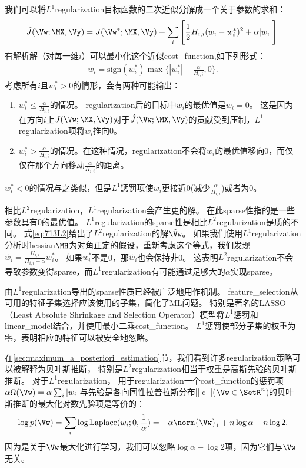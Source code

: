 我们可以将$L^1$\gls{regularization}目标函数的二次近似分解成一个关于参数的求和：
\begin{align}
 \hat J(\Vw; \MX, \Vy) = J(\Vw^*; \MX, \Vy) + \sum_i \Bigg [\frac{1}{2} H_{i,i} (w_i - w_i^*)^2 
 + \alpha |w_i| \Bigg].  %
\end{align}
有解析解（对每一维$i$）可以最小化这个近似\gls{cost_function},如下列形式：
\begin{align}
w_i = \text{sign}(w_i^*) \max\Big\{ |w_i^*| - \frac{\alpha}{H_{i,i}} , 0\Big\} .
\end{align}
考虑所有$i$且$w_i^* > 0$的情形，会有两种可能输出：
\begin{enumerate}
\item $w_i^* \leq \frac{\alpha}{H_{i,i}}$的情况。
\gls{regularization}后的目标中$w_i$的最优值是$w_i = 0$。
这是因为在方向$i$上$J(\Vw; \MX, \Vy) $对于$ \hat J(\Vw; \MX, \Vy)$的贡献受到压制，$L^1$\gls{regularization}项将$w_i$推向0。
\item  $w_i^* > \frac{\alpha}{H_{i,i}}$的情况。在这种情况，\gls{regularization}不会将$w_i$的最优值移向0，而仅仅在那个方向移动$\frac{\alpha}{H_{i,i}}$的距离。
\end{enumerate}
$w_i^* < 0$的情况与之类似，但是$L^1$惩罚项使$w_i$更接近0(减少$ \frac{\alpha}{H_{i,i}}$)或者为0。

相比$L^2$\gls{regularization}，$L^1$\gls{regularization}会产生更的解。
在此\gls{sparse}性指的是一些参数具有0的最优值。
$L^1$\gls{regularization}的\gls{sparse}性是相比$L^2$\gls{regularization}是质的不同。
式\ref{eq:713L2}给出了$L^2$\gls{regularization}的解$\tilde \Vw$。 
如果我们使用$L^1$\gls{regularization}分析时\gls{hessian}$\MH$为对角正定的假设，重新考虑这个等式，我们发现
$\tilde{w_i} = \frac{H_{i,i}}{H_{i,i} + \alpha} w_i^*$。
如果$w_i^*$不是0，那$\tilde{w_i}$也会保持非0。 
这表明$L^2$\gls{regularization}不会导致参数变得\gls{sparse}，而$L^1$\gls{regularization}有可能通过足够大的$\alpha$实现\gls{sparse}。
 
由$L^1$\gls{regularization}导出的\gls{sparse}性质已经被广泛地用作机制。
\gls{feature_selection}从可用的特征子集选择应该使用的子集，简化了\gls{ML}问题。
特别是著名的LASSO\citep{Tibshirani95}（Least Absolute Shrinkage and
Selection Operator）模型将$L^1$惩罚和\gls{linear_model}结合，并使用最小二乘\gls{cost_function}。 
$L^1$惩罚使部分子集的权重为零，表明相应的特征可以被安全地忽略。
 
在\ref{sec:maximum_a_posteriori_estimation}节，我们看到许多\gls{regularization}策略可以被解释为贝叶斯推断，
 特别是$L^2$\gls{regularization}相当于权重是高斯先验的贝叶斯推断。
 对于$L^1$\gls{regularization}，
用于\gls{regularization}一个\gls{cost_function}的惩罚项$\alpha \Omega(\Vw) =  \alpha \sum_i |w_i |$与先验是各向同性拉普拉斯分布|||c|||($\Vw \in \SetR^n$)的贝叶斯推断的最大化对数先验项是等价的：
\begin{align}
\log p(\Vw) = \sum_i \log \text{Laplace}(w_i;0,\frac{1}{\alpha}) = 
  -\alpha \norm{\Vw}_1 + n \log \alpha - n \log 2.
\end{align}
因为是关于$\Vw$最大化进行学习，我们可以忽略$\log \alpha - \log 2$项，因为它们与$\Vw$无关。
 
